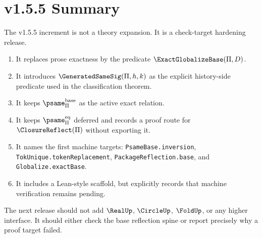 \chapter{v1.5.5 Summary}
\label{ch:v155-summary}

The v1.5.5 increment is not a theory expansion. It is a check-target hardening release.

\begin{enumerate}
  \item It replaces prose exactness by the predicate \(\ExactGlobalizeBase(\Pi,D)\).
  \item It introduces \(\GeneratedSameSig(\Pi,h,k)\) as the explicit history-side predicate used in the classification theorem.
  \item It keeps \(\psame_{\Pi}^{\mathrm{base}}\) as the active exact relation.
  \item It keeps \(\psame_{\Pi}^{\mathrm{eq}}\) deferred and records a proof route for \(\ClosureReflect(\Pi)\) without exporting it.
  \item It names the first machine targets: \texttt{PsameBase.inversion}, \texttt{TokUnique.tokenReplacement}, \texttt{PackageReflection.base}, and \texttt{Globalize.exactBase}.
  \item It includes a Lean-style scaffold, but explicitly records that machine verification remains pending.
\end{enumerate}

The next release should not add \(\RealUp\), \(\CircleUp\), \(\FoldUp\), or any higher interface. It should either check the base reflection spine or report precisely why a proof target failed.
